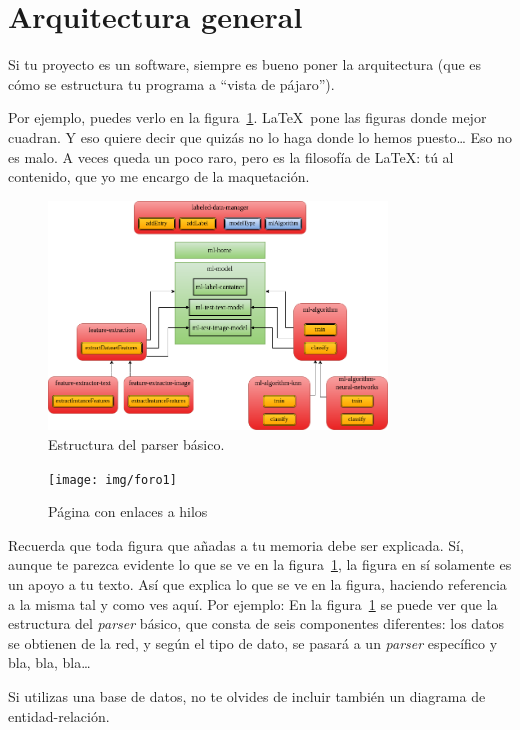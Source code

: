 \documentclass[a4paper, 12pt]{book}
\begin{document}
\section{Arquitectura general} 
\label{sec:arquitectura}

Si tu proyecto es un software, siempre es bueno poner la arquitectura (que es cómo se estructura tu programa a ``vista de pájaro'').

Por ejemplo, puedes verlo en la figura~\ref{fig:arquitectura}.
\LaTeX \ pone las figuras donde mejor cuadran. 
Y eso quiere decir que quizás no lo haga donde lo hemos puesto\ldots
Eso no es malo.
A veces queda un poco raro, pero es la filosofía de \LaTeX: tú al contenido, que yo me encargo de la maquetación.

\begin{figure}
  \centering
  \includegraphics[width=9cm, keepaspectratio]{img/arquitectura.png}
  \caption{Estructura del parser básico.}\label{fig:arquitectura}
\end{figure}

\begin{figure}
    \centering
    \texttt{[image: img/foro1]}
    \caption{Página con enlaces a hilos}\label{fig:_arquitectura}
\end{figure}

 
Recuerda que toda figura que añadas a tu memoria debe ser explicada.
Sí, aunque te parezca evidente lo que se ve en la figura~\ref{fig:arquitectura}, la figura en sí solamente es un apoyo a tu texto.
Así que explica lo que se ve en la figura, haciendo referencia a la misma tal y como ves aquí.
Por ejemplo: En la figura~\ref{fig:arquitectura} se puede ver que la estructura del \emph{parser} básico, que consta de seis componentes diferentes: los datos se obtienen de la red, y según el tipo de dato, se pasará a un \emph{parser} específico y bla, bla, bla\ldots

Si utilizas una base de datos, no te olvides de incluir también un diagrama de entidad-relación.
\end{document}
